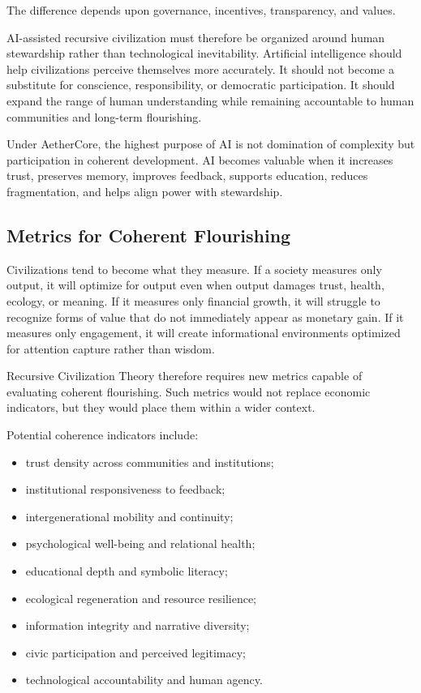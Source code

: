 \documentclass[12pt]{article}
\begin{document}
The difference depends upon governance, incentives, transparency, and values.

AI-assisted recursive civilization must therefore be organized around human stewardship rather than technological inevitability. Artificial intelligence should help civilizations perceive themselves more accurately. It should not become a substitute for conscience, responsibility, or democratic participation. It should expand the range of human understanding while remaining accountable to human communities and long-term flourishing.

Under AetherCore, the highest purpose of AI is not domination of complexity but participation in coherent development. AI becomes valuable when it increases trust, preserves memory, improves feedback, supports education, reduces fragmentation, and helps align power with stewardship.

\subsection{Metrics for Coherent Flourishing}

Civilizations tend to become what they measure. If a society measures only output, it will optimize for output even when output damages trust, health, ecology, or meaning. If it measures only financial growth, it will struggle to recognize forms of value that do not immediately appear as monetary gain. If it measures only engagement, it will create informational environments optimized for attention capture rather than wisdom.

Recursive Civilization Theory therefore requires new metrics capable of evaluating coherent flourishing. Such metrics would not replace economic indicators, but they would place them within a wider context.

Potential coherence indicators include:

\begin{itemize}
  \item trust density across communities and institutions;
  \item institutional responsiveness to feedback;
  \item intergenerational mobility and continuity;
  \item psychological well-being and relational health;
  \item educational depth and symbolic literacy;
  \item ecological regeneration and resource resilience;
  \item information integrity and narrative diversity;
  \item civic participation and perceived legitimacy;
  \item technological accountability and human agency.
\end{itemize}
\end{document}
